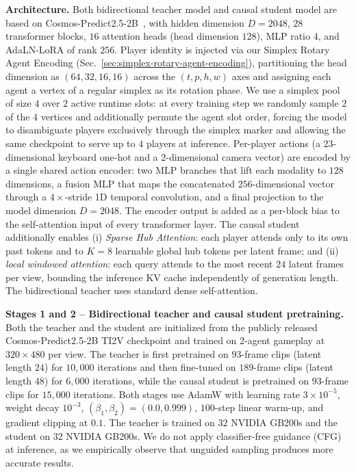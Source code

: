 \noindent\textbf{Architecture.}
Both bidirectional teacher model and causal student model are based on Cosmos-Predict2.5-2B~\cite{ali2025world-simulation},  with hidden dimension $D=2048$, $28$ transformer blocks, $16$ attention heads (head dimension $128$), MLP ratio $4$, and AdaLN-LoRA of rank $256$. Player identity is injected via our Simplex Rotary Agent Encoding (Sec.~\ref{sec:simplex-rotary-agent-encoding}), partitioning the head dimension as $(64, 32, 16, 16)$ across the $(t, p, h, w)$ axes and assigning each agent a vertex of a regular simplex as its rotation phase. We use a simplex pool of size $4$ over $2$ active runtime slots: at every training step we randomly sample $2$ of the $4$ vertices and additionally permute the agent slot order, forcing the model to disambiguate players exclusively through the simplex marker and allowing the same checkpoint to serve up to $4$ players at inference. Per-player actions (a $23$-dimensional keyboard one-hot and a $2$-dimensional camera vector) are encoded by a single shared action encoder: two MLP branches that lift each modality to $128$ dimensions, a fusion MLP that maps the concatenated $256$-dimensional vector through a $4\times$-stride 1D temporal convolution, and a final projection to the model dimension $D=2048$. The encoder output is added as a per-block bias to the self-attention input of every transformer layer. The causal student additionally enables (i) \emph{Sparse Hub Attention}: each player attends only to its own past tokens and to $K=8$ learnable global hub tokens per latent frame; and (ii) \emph{local windowed attention}: each query attends to the most recent $24$ latent frames per view, bounding the inference KV cache independently of generation length. The bidirectional teacher uses standard dense self-attention.

\noindent\textbf{Stages 1 and 2 -- Bidirectional teacher and causal student pretraining.}
Both the teacher and the student are initialized from the publicly released Cosmos-Predict2.5-2B TI2V checkpoint and trained on 2-agent gameplay at $320 \times 480$ per view. The teacher is first pretrained on $93$-frame clips (latent length $24$) for $10{,}000$ iterations and then fine-tuned on $189$-frame clips (latent length $48$) for $6{,}000$ iterations, while the causal student is pretrained on $93$-frame clips for $15{,}000$ iterations. Both stages use AdamW with learning rate $3{\times}10^{-5}$, weight decay $10^{-3}$, $(\beta_1, \beta_2) = (0.0, 0.999)$, $100$-step linear warm-up, and gradient clipping at $0.1$. The teacher is trained on $32$ NVIDIA GB200s and the student on $32$ NVIDIA GB200s. We do not apply classifier-free guidance (CFG) at inference, as we empirically observe that unguided sampling produces more accurate results.

